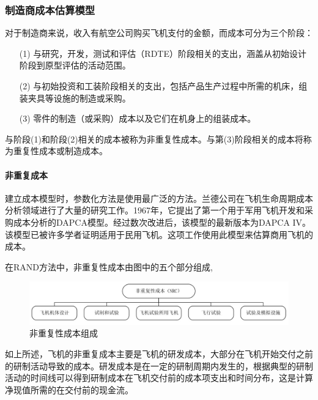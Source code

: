 \documentclass[12pt,a4paper]{report}
\begin{document}
\subsubsection{制造商成本估算模型}
对于制造商来说，收入有航空公司购买飞机支付的金额，而成本可分为三个阶段：
\begin{itemize}
    \item[(1)]与研究，开发，测试和评估（RDTE）阶段相关的支出，涵盖从初始设计阶段到原型评估的活动范围。
    \item[(2)] 与初始投资和工装阶段相关的支出，包括产品生产过程中所需的机床，组装夹具等设施的制造或采购。
    \item[(3)]零件的制造（或采购）成本以及它们在机身上的组装成本。
\end{itemize}
与阶段(1)和阶段(2)相关的成本被称为非重复性成本。与第(3)阶段相关的成本将称为重复性成本或制造成本。


\paragraph{非重复成本}
建立成本模型时，参数化方法是使用最广泛的方法。兰德公司在飞机生命周期成本分析领域进行了大量的研究工作。1967年，它提出了第一个用于军用飞机开发和采购成本分析的DAPCA模型。经过数次改进后，该模型的最新版本为DAPCA IV。该模型已被许多学者证明适用于民用飞机。这项工作使用此模型来估算商用飞机的成本。

在RAND方法中，非重复性成本由图中的五个部分组成,
\begin{figure}[!htp]
  \centering
  \includegraphics[width=.9\textwidth]{eps/NRC.jpg}
  \caption{非重复性成本组成}
 \label{fig:NRC}
\end{figure}

如上所述，飞机的非重复成本主要是飞机的研发成本，大部分在飞机开始交付之前的研制活动导致的成本。研发成本是在一定的研制周期内发生的，根据典型的研制活动的时间线可以得到研制成本在飞机交付前的成本项支出和时间分布，这是计算净现值所需的在交付前的现金流。
\end{document}

